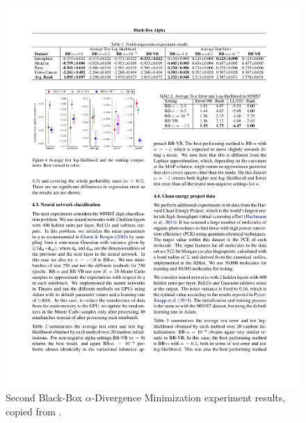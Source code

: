 \documentclass[12pt,vu]{adammath}
\theoremstyle{plain}
\theoremstyle{definition}
\theoremstyle{remark}
\begin{document}
\begin{figure}[p]\label{f:bbalpha2}
  \centering\includegraphics{figures/from-bb-alpha-2.pdf}
  \caption{Second Black-Box $\alpha$-Divergence Minimization experiment results, copied from \cite{bbalpha}.}
\end{figure}
\end{document}
